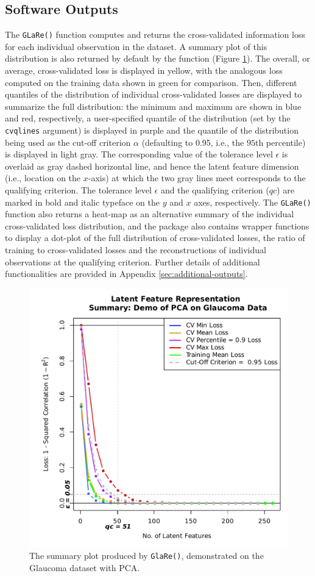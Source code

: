\subsection{Software Outputs}

The \texttt{GLaRe()} function computes and returns the cross-validated information loss for each individual observation in the dataset.
A summary plot of this distribution is also returned by default by the function (Figure \ref{fig:glare-anatomy-plot}).
The overall, or average, cross-validated loss is displayed in yellow, with the analogous loss computed on the training data shown in green for comparison.
Then, different quantiles of the distribution of individual cross-validated losses are displayed to summarize the full distribution: the minimum and maximum are shown in blue and red, respectively, a user-specified quantile of the distribution (set by the \texttt{cvqlines} argument) is displayed in purple and the quantile of the distribution being used as the cut-off criterion $\alpha$ (defaulting to 0.95, i.e., the $95$th percentile) is displayed in light gray.
The corresponding value of the tolerance level $\epsilon$ is overlaid as gray dashed horizontal line, and hence the latent feature dimension (i.e., location on the $x$-axis) at which the two gray lines meet corresponds to the qualifying criterion.
The tolerance level $\epsilon$ and the qualifying criterion ($qc$) are marked in bold and italic typeface on the $y$ and $x$ axes, respectively.
The \texttt{GLaRe()} function also returns a heat-map as an alternative summary of the individual cross-validated loss distribution, and the package also contains wrapper functions to display a dot-plot of the full distribution of cross-validated losses, the ratio of training to cross-validated losses and the reconstructions of individual observations at the qualifying criterion. 
Further details of additional functionalities are provided in Appendix \ref{sec:additional-outputs}.

\begin{figure}
    \centering
    \includegraphics[width=0.5\linewidth]{figures/glare-anatomy-plot.pdf}
    \caption{The summary plot produced by \texttt{GlaRe()}, demonstrated on the Glaucoma dataset with PCA.}
    \label{fig:glare-anatomy-plot}
\end{figure}